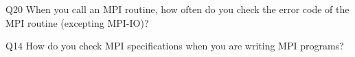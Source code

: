 \begin{description}%
\item{Q20} When you call an MPI routine, how often do you check the error code of the MPI routine  (excepting MPI-IO)?%
\item{Q14} How do you check MPI specifications when you are writing MPI programs?%
\end{description}%
